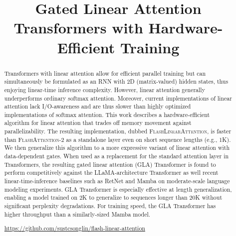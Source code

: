 \title{Gated Linear Attention Transformers with Hardware-Efficient Training}




\printAffiliationsAndNotice{\icmlEqualContribution} %
\vspace{-2mm}
\begin{abstract}
\vspace{-1mm}
Transformers with linear attention allow for efficient parallel training  but can simultaneously  be formulated as an RNN with 2D (matrix-valued) hidden states, thus enjoying  linear-time inference complexity. However, linear attention generally underperforms ordinary softmax attention. Moreover, current implementations of linear attention  lack I/O-awareness and are thus slower than highly optimized implementations of softmax attention. This work  describes a hardware-efficient algorithm for linear attention that trades off memory movement against parallelizability. The resulting implementation, dubbed \textsc{FlashLinearAttention}, is faster than \textsc{FlashAttention-2} \cite{flashattention2} as a standalone layer even on short sequence lengths (e.g., 1K). We then generalize this algorithm to 
 a more expressive variant of linear attention with data-dependent gates. When used as a replacement for the standard attention layer in Transformers, the resulting gated linear attention (GLA) Transformer is found to perform  competitively against the LLaMA-architecture Transformer \citep{touvron2023llama} as well recent linear-time-inference baselines such as RetNet \citep{sun2023retentive} and Mamba \citep{Gu2023MambaLS} on moderate-scale language modeling experiments.  GLA Transformer is especially effective at length generalization, enabling a model trained on 2K  to generalize to sequences longer than 20K without significant perplexity degradations. For training speed, the GLA Transformer has higher throughput than a similarly-sized Mamba model.

\begin{minipage}{\linewidth}

   \faGithub \quad  \url{https://github.com/sustcsonglin/flash-linear-attention}
\end{minipage}

 
\end{abstract}

